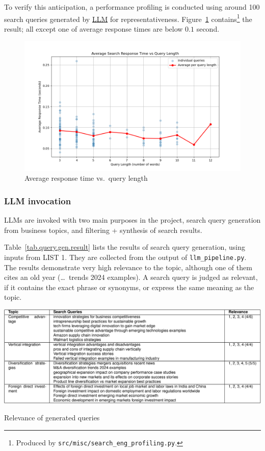 \documentclass[final-report]{report-template}
\newcommand\ttb{\discretionary{}{}{}}
\begin{document}
To verify this anticipation, a performance profiling is conducted using around
100 search queries generated by
\href{https://chatgpt.com/share/689a013a-5964-8011-af0d-68a169ce8290}{LLM} for
representativeness. Figure~\ref{fig.response.time} contains\footnote{
Produced by \texttt{src/\ttb misc/\ttb search\_\ttb eng\_\ttb profiling.py}.
}
the result; all
except one of average response times are below $0.1$ second.
\begin{figure}[hbtp!]
	\centering
	\includegraphics[height=.25\textheight]{res/avg_time_vs_query_length.png}
	\caption{Average response time vs.\ query length}
	\label{fig.response.time}
\end{figure}

\subsubsection{LLM invocation}
LLMs are invoked with two main purposes in the project, search query generation
from business topics, and filtering + synthesis of search results.

Table~\ref{tab.query.gen.result} lists the results of search query generation,
using inputs from LIST 1. They are collected from the output of
\texttt{llm\_\ttb pipeline.py}. The results demonstrate very high relevance to
the topic, although one of them cites an old year (\dots\ trends 2024
examples). A search query is judged as relevant, if it contains the exact
phrase or synonyms, or express the same meaning as the topic.
\begin{table}[hbtp!]
\centering
\includegraphics[width=.85\textwidth]{res/table_search_queries.png}
\caption{Relevance of generated queries}
\label{tab.query.gen.result}
\end{table}
\end{document}
